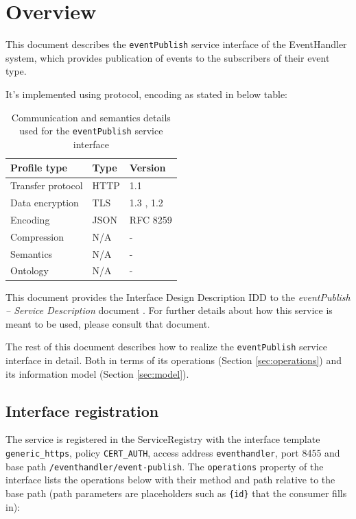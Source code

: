 \documentclass[a4paper]{arrowhead}
\begin{document}
\section{Overview}
\label{sec:overview}

This document describes the \texttt{eventPublish} service interface of the EventHandler system, which provides publication of events to the subscribers of their event type.

It's implemented using protocol, encoding as stated in below table:
\begin{table}[ht!]
  \centering
  \begin{tabular}{|l|l|l|}
    \hline
    \rowcolor{gray!33} Profile type & Type & Version \\ \hline
    Transfer protocol & HTTP & 1.1 \cite{rfc9112} \\ \hline
    Data encryption & TLS & 1.3 \cite{rfc8446}, 1.2 \cite{rfc5246} \\ \hline
    Encoding & JSON & RFC 8259 \cite{rfc8259} \\ \hline
    Compression & N/A & - \\ \hline
    Semantics & N/A & - \\ \hline
    Ontology & N/A & - \\ \hline
  \end{tabular}
  \caption{Communication and semantics details used for the \texttt{eventPublish} service interface}
  \label{tab:comunication_semantics_profile}
\end{table}

This document provides the Interface Design Description IDD to the \textit{eventPublish -- Service Description} document \cite{eh-eventPublish-sd}.
For further details about how this service is meant to be used, please consult that document.

The rest of this document describes how to realize the \texttt{eventPublish} service
interface in detail. Both in terms of its operations (Section \ref{sec:operations}) and its information model (Section \ref{sec:model}).

\subsection{Interface registration}

The service is registered in the ServiceRegistry with the interface template \texttt{generic\_\allowbreak{}https}, policy \texttt{CERT\_\allowbreak{}AUTH}, access address \texttt{eventhandler}, port 8455 and base path \texttt{/\allowbreak{}eventhandler/\allowbreak{}event-\allowbreak{}publish}. The \texttt{operations} property of the interface lists the operations below with their method and path relative to the base path (path parameters are placeholders such as \texttt{\{id\}} that the consumer fills in):
\end{document}
